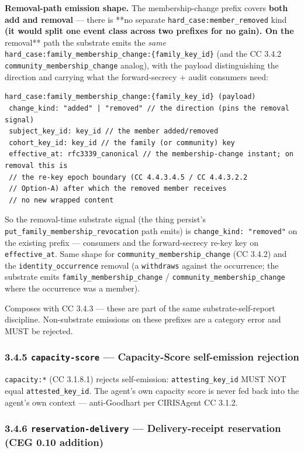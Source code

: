 \documentclass[11pt]{article}
\begin{document}
\textbf{Removal-path emission shape.} The membership-change prefix covers \textbf{both add and removal} — there is **no separate \texttt{hard\_case:member\_removed} kind\textbf{ (it would split one event class across two prefixes for no gain). On the }removal** path the substrate emits the \textit{same} \texttt{hard\_case:family\_membership\_change:\{family\_key\_id\}} (and the CC 3.4.2 \texttt{community\_membership\_change} analog), with the payload distinguishing the direction and carrying what the forward-secrecy + audit consumers need:


\begin{lstlisting}
hard_case:family_membership_change:{family_key_id} (payload)
 change_kind: "added" | "removed" // the direction (pins the removal signal)
 subject_key_id: key_id // the member added/removed
 cohort_key_id: key_id // the family (or community) key
 effective_at: rfc3339_canonical // the membership-change instant; on removal this is
 // the re-key epoch boundary (CC 4.4.3.4.5 / CC 4.4.3.2.2
 // Option-A) after which the removed member receives
 // no new wrapped content
\end{lstlisting}

So the removal-time substrate signal (the thing persist's \texttt{put\_family\_membership\_revocation} path emits) is \texttt{change\_kind: "removed"} on the existing prefix — consumers and the forward-secrecy re-key key on \texttt{effective\_at}. Same shape for \texttt{community\_membership\_change} (CC 3.4.2) and the \texttt{identity\_occurrence} removal (a \texttt{withdraws} against the occurrence; the substrate emits \texttt{family\_membership\_change} / \texttt{community\_membership\_change} where the occurrence was a member).


Composes with CC 3.4.3 — these are part of the same substrate-self-report discipline. Non-substrate emissions on these prefixes are a category error and MUST be rejected.


\subsubsection*{3.4.5 \texttt{capacity-score} — Capacity-Score self-emission rejection}


\texttt{capacity:*} (CC 3.1.8.1) rejects self-emission: \texttt{attesting\_key\_id} MUST NOT equal \texttt{attested\_key\_id}. The agent's own capacity score is never fed back into the agent's own context — anti-Goodhart per CIRISAgent CC 3.1.2.


\subsubsection*{3.4.6 \texttt{reservation-delivery} — Delivery-receipt reservation (CEG 0.10 addition)}
\end{document}
